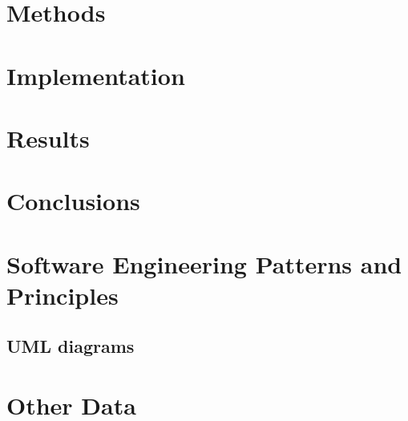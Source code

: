 \documentclass{report}
\begin{document}
\chapter{Methods}

\chapter{Implementation}

\chapter{Results}


\chapter{Conclusions}




\begin{appendices}
\chapter{Software Engineering Patterns and Principles}
	\section{UML diagrams}
\chapter{Other Data}
	
\end{appendices}
\end{document}
